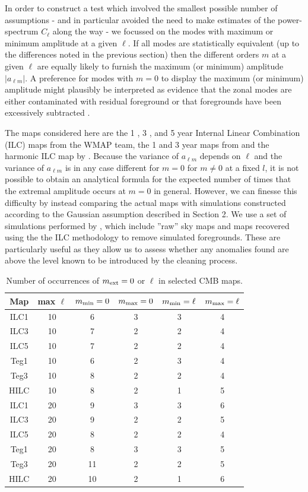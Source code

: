 \documentclass[useAMS,usenatbib,usegraphicx]{mn2e}
\def\l{{\ell}}
\def\lm{{\l m}}
\def\alm{a_{\lm}}
\def\cl{C_{\l}}
\begin{document}
In order to construct a test which involved the smallest possible
number of assumptions - and in particular avoided the need to make
estimates of the power-spectrum $\cl$ along the way - we focussed on
the modes with maximum or minimum amplitude at a given $\l$. If all
modes are statistically equivalent (up to the differences noted in
the previous section) then the different orders $m$ at a given $\l$
are equally likely to furnish the maximum (or minimum) amplitude
$|\alm|$. A preference for modes with $m=0$ to display the maximum
(or minimum) amplitude might plausibly be interpreted as evidence
that the zonal modes are either contaminated with residual
foreground or that foregrounds have been excessively subtracted
\citep{cnc3,ch07,nvn}.

The maps considered here are the 1 \citep{b1}, 3 \citep{b2}, and 5
year \citep{b3} Internal Linear Combination (ILC) maps from the WMAP
team, the 1 and 3 year maps from \cite{b4} and the harmonic ILC map
by \cite{b5}. Because the variance of $\alm$ depends on $\l$ and the
variance of $\alm$ is in any case different for $m=0$ for $m\neq 0$
at a fixed $l$, it is not possible to obtain an analytical formula
for the expected number of times that the extremal amplitude occurs
at $m=0$ in general. However, we can finesse this difficulty by
instead comparing the actual maps with simulations constructed
according to the Gaussian assumption described in Section 2. We use
a set of simulations performed by \cite{b6}, which include ''raw''
sky maps and maps recovered using the the ILC methodology to remove
simulated foregrounds. These are particularly useful as they allow
us to assess whether any anomalies found are above the level known
to be introduced by the cleaning process.
\begin{table}
  \begin{tabular}{|c|c|c||c|c|c|}
    \hline \hline
    Map & max $\l$ & $m_{\rm min}=0$ & $m_{\rm max}=0$  & $m_{\rm min}=\l$ & $m_{\rm max}=\l$ \\ \hline
    ILC1     & 10 & 6    & 3  &  3    &  4    \\
    ILC3     & 10 & 7    & 2  &  2    &  4    \\
    ILC5     & 10 & 7    & 2  &  2    &  4    \\
    Teg1     & 10 & 6    & 2  &  3    &  4    \\
    Teg3     & 10 & 8    & 2  &  2    &  4    \\
    HILC     & 10 & 8    & 2  &  1    &  5    \\ \hline
    ILC1     & 20 & 9    & 3  &  3    &  6    \\
    ILC3     & 20 & 9    & 2  &  2    &  5    \\
    ILC5     & 20 & 8    & 2  &  2    &  4    \\
    Teg1     & 20 & 8    & 3  &  3    &  5    \\
    Teg3     & 20 & 11   & 2  &  2    &  5    \\
    HILC     & 20 & 10   & 2  &  1    &  6    \\ \hline
    \hline
  \end{tabular}
  \caption{Number of occurrences of $m_{\rm ext}=0$ or $\l$ in selected CMB maps.}
  \label{TABnum}
\end{table}
\end{document}
